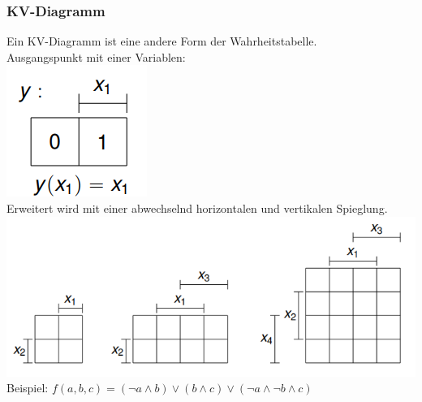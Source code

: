 \documentclass[12pt]{article}
\begin{document}
\subsubsection{KV-Diagramm}
Ein KV-Diagramm ist eine andere Form der Wahrheitstabelle. \\
Ausgangspunkt mit einer Variablen: \\
\includegraphics[scale=0.5]{image.png} \\
Erweitert wird mit einer abwechselnd horizontalen und vertikalen Spieglung. \\
\includegraphics[scale=0.5]{image2.png} \\
Beispiel: $f(a,b,c) = (\neg a \land b) \lor (b \land c) \lor (\neg a \land \neg b \land c)$ \\
\end{document}
